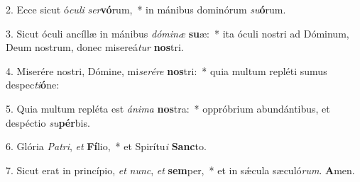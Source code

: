 2. Ecce sicut ó\textit{cu}\textit{li} \textit{ser}\textbf{vó}rum,~*  in mánibus dominórum \textit{su}\textbf{ó}rum.\

3. Sicut óculi ancíllæ in mánibus \textit{dó}\textit{mi}\textit{næ} \textbf{su}æ:~*  ita óculi nostri ad Dóminum, Deum nostrum, donec misereá\textit{tur} \textbf{nos}tri.\

4. Miserére nostri, Dómine, mi\textit{se}\textit{ré}\textit{re} \textbf{nos}tri:~*  quia multum repléti sumus despec\textit{ti}\textbf{ó}ne:\

5. Quia multum repléta est \textit{á}\textit{ni}\textit{ma} \textbf{nos}tra:~*  oppróbrium abundántibus, et despéctio \textit{su}\textbf{pér}bis.\

6. Glória \textit{Pa}\textit{tri}, \textit{et} \textbf{Fí}lio,~*  et Spirítu\textit{i} \textbf{Sanc}to.\

7. Sicut erat in princípio, \textit{et} \textit{nunc}, \textit{et} \textbf{sem}per,~*  et in sǽcula sæculó\textit{rum}. \textbf{A}men.\

